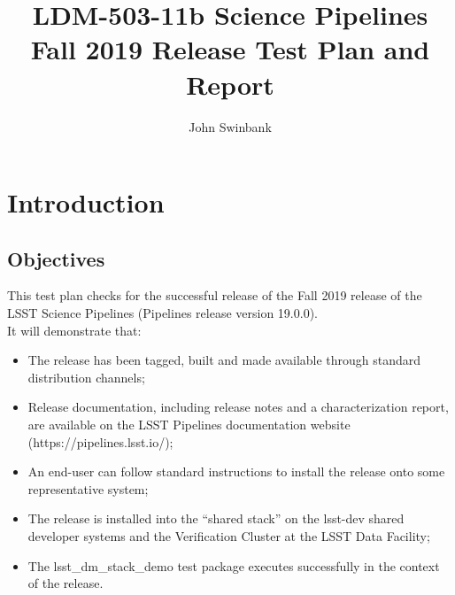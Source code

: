 \documentclass[DM,lsstdraft,STR,toc]{lsstdoc}
\providecommand{\tightlist}{
  \setlength{\itemsep}{0pt}\setlength{\parskip}{0pt}}
\begin{document}
\def\milestoneName{Science Pipelines Fall 2019 Release}
\def\milestoneId{LDM-503-11b}
\def\product{Science Pipelines SW}


\title{ LDM-503-11b Science Pipelines Fall 2019 Release Test Plan and Report}
\setDocRef{\lsstDocType-\lsstDocNum}
\date{\vcsdate}
\author{ John Swinbank }






\maketitle

\section{Introduction}
\label{sect:intro}


\subsection{Objectives}
\label{sect:objectives}

This test plan checks for the successful release of the Fall 2019
release of the LSST Science Pipelines (Pipelines release version
19.0.0).\\[2\baselineskip]It will demonstrate that:\\[2\baselineskip]

\begin{itemize}
\tightlist
\item
  The release has been tagged, built and made available through standard
  distribution channels;
\item
  Release documentation, including release notes and a characterization
  report, are available on the LSST Pipelines documentation website
  (https://pipelines.lsst.io/);
\item
  An end-user can follow standard instructions to install the release
  onto some representative system;
\item
  The release is installed into the ``shared stack'' on the lsst-dev
  shared developer systems and the Verification Cluster at the LSST Data
  Facility;
\item
  The lsst\_dm\_stack\_demo test package executes successfully in the
  context of the release.
\end{itemize}
\end{document}
